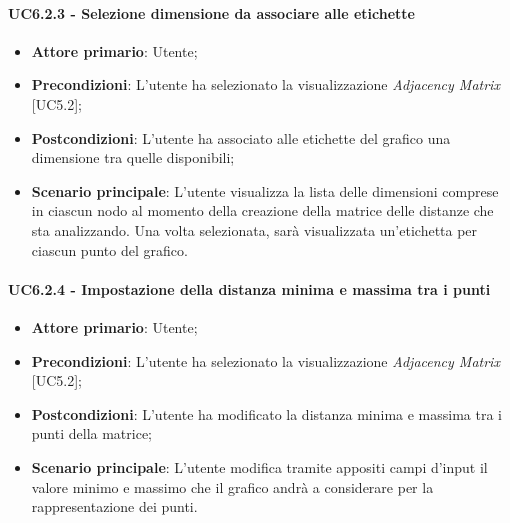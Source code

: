 \paragraph{UC6.2.3 - Selezione dimensione da associare alle etichette}
\begin{itemize}
	\item \textbf{Attore primario}: Utente;
	\item \textbf{Precondizioni}: L'utente ha selezionato la visualizzazione \textit{Adjacency Matrix} [UC5.2];
	\item \textbf{Postcondizioni}: L'utente ha associato alle etichette del grafico una dimensione tra quelle disponibili;
	
	\item \textbf{Scenario principale}: L'utente visualizza la lista delle dimensioni comprese in ciascun nodo al momento della creazione della matrice delle distanze che sta analizzando. Una volta selezionata, sarà visualizzata un'etichetta per ciascun punto del grafico.
\end{itemize}

\paragraph{UC6.2.4 - Impostazione della distanza minima e massima tra i punti}
\begin{itemize}
	\item \textbf{Attore primario}: Utente;
	\item \textbf{Precondizioni}: L'utente ha selezionato la visualizzazione \textit{Adjacency Matrix} [UC5.2];
	\item \textbf{Postcondizioni}: L'utente ha modificato la distanza minima e massima tra i punti della matrice;
	
	\item \textbf{Scenario principale}: L'utente modifica tramite appositi campi d'input il valore minimo e massimo che il grafico andrà a considerare per la rappresentazione dei punti.
\end{itemize}